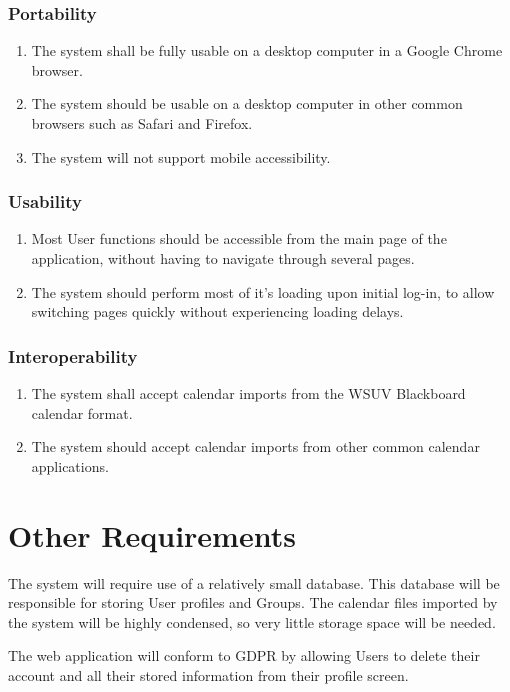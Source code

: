 \documentclass{scrreprt}
\begin{document}
\subsection{Portability}
\begin{enumerate}
\item The system shall be fully usable on a desktop computer in a Google Chrome
browser.
\item The system should be usable on a desktop computer in other common browsers
such as Safari and Firefox.
\item The system will not support mobile accessibility.
\end{enumerate}

\subsection{Usability}
\begin{enumerate}
\item Most User functions should be accessible from the main page of the application,
without having to navigate through several pages.
\item The system should perform most of it's loading upon initial log-in, to allow
switching pages quickly without experiencing loading delays.
\end{enumerate}

\subsection{Interoperability}
\begin{enumerate}
\item The system shall accept calendar imports from the WSUV Blackboard calendar
format.
\item The system should accept calendar imports from other common calendar
applications.
\end{enumerate}

\chapter{Other Requirements}
The system will require use of a relatively small database. This database will be responsible for storing User profiles and Groups. The calendar files imported by the system will be highly condensed, so very little storage space will be needed.

The web application will conform to GDPR by allowing Users to delete their account and all their stored information from their profile screen.
\end{document}
